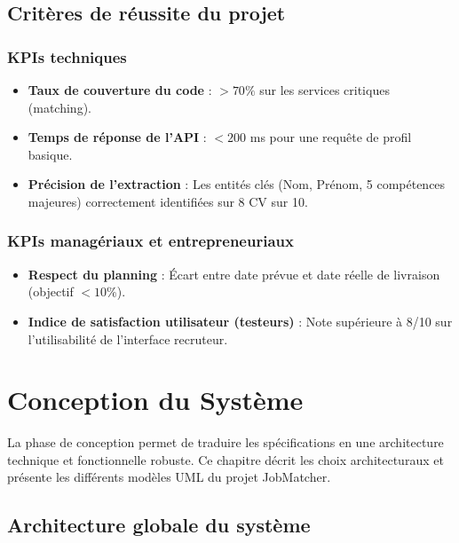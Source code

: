 \documentclass[12pt,a4paper]{report}
\begin{document}
\section{Critères de réussite du projet}

\subsection{KPIs techniques}
\begin{itemize}
    \item \textbf{Taux de couverture du code} : $> 70\%$ sur les services critiques (matching).
    \item \textbf{Temps de réponse de l'API} : $< 200$ ms pour une requête de profil basique.
    \item \textbf{Précision de l'extraction} : Les entités clés (Nom, Prénom, 5 compétences majeures) correctement identifiées sur 8 CV sur 10.
\end{itemize}

\subsection{KPIs managériaux et entrepreneuriaux}
\begin{itemize}
    \item \textbf{Respect du planning} : Écart entre date prévue et date réelle de livraison (objectif $< 10\%$).
    \item \textbf{Indice de satisfaction utilisateur (testeurs)} : Note supérieure à 8/10 sur l'utilisabilité de l'interface recruteur.
\end{itemize}

\chapter{Conception du Système}

La phase de conception permet de traduire les spécifications en une architecture technique et fonctionnelle robuste. Ce chapitre décrit les choix architecturaux et présente les différents modèles UML du projet JobMatcher.

\section{Architecture globale du système}
\end{document}
